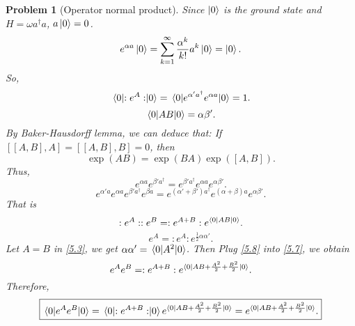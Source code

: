 \documentclass{article}
\theoremstyle{1}
\newtheorem{problem}{Problem}
\begin{document}
\begin{problem}[Operator normal product]
    Since $\ket{0}$ is the ground state and $H=\omega a^\dagger a$, $a\ket{0}=0$.
    \begin{equation}
        e^{\alpha a}\ket{0}=\sum_{k=1}^{\infty} \frac{\alpha^k}{k!}a^k\ket{0}=\ket{0}.
    \end{equation}
    So,
    \begin{equation}
        \expval{:e^A:}{0}=\expval{e^{\alpha' a^\dagger}e^{\alpha a}}{0}=1.
    \end{equation}
    \begin{equation}\label{5.3}
        \expval{AB}{0}=\alpha\beta'.
    \end{equation}
    By Baker-Hausdorff lemma, we can deduce that: If $[[A,B],A]=[[A,B],B]=0$, then
    \begin{equation}
        \exp(AB)=\exp(BA)\exp([A,B]).
    \end{equation}
    Thus,
    \begin{equation}
        e^{\alpha a}e^{\beta' a^\dagger}=e^{\beta' a^\dagger}e^{\alpha a}e^{\alpha \beta'}.
    \end{equation}
    \begin{equation}
        e^{\alpha' a}e^{\alpha a}e^{\beta' a^\dagger}e^{\beta a}=e^{(\alpha'+\beta')a^\dagger}e^{(\alpha+\beta)a}e^{\alpha \beta'}.
    \end{equation}
    That is 
    \begin{equation}\label{5.7}
        :e^A::e^B=:e^{A+B}:e^{\expval{AB}{0}}.
    \end{equation}
    \begin{equation}\label{5.8}
        e^A=:e^A:e^{\frac{1}{2}\alpha\alpha'}.
    \end{equation}
    Let $A=B$ in \eqref{5.3}, we get $\alpha\alpha'=\expval{A^2}{0}$. Then Plug \eqref{5.8} into \eqref{5.7}, we obtain
    \begin{equation}
        e^Ae^B=:e^{A+B}:e^{\expval{AB+\frac{A^2}{2}+\frac{B^2}{2}}{0}}.
    \end{equation}
    Therefore,
    \begin{equation}
    \boxed{
        \expval{e^Ae^B}{0}=\expval{:e^{A+B}:}{0}e^{\expval{AB+\frac{A^2}{2}+\frac{B^2}{2}}{0}}=e^{\expval{AB+\frac{A^2}{2}+\frac{B^2}{2}}{0}}.}
    \end{equation}
\end{problem}
\end{document}
